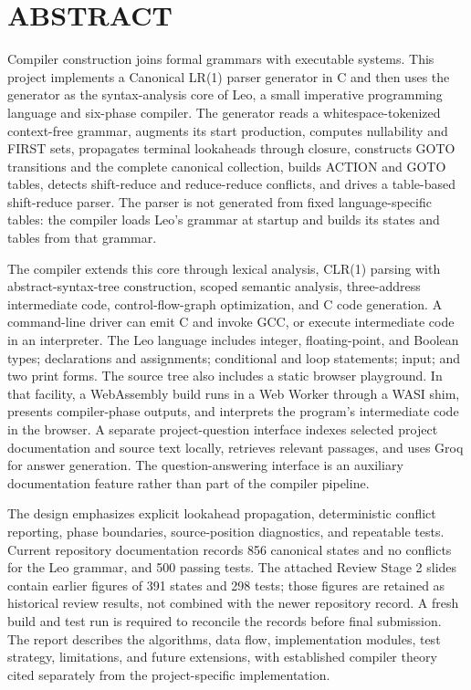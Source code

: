 \documentclass[12pt,a4paper,oneside]{report}
\begin{document}
\chapter*{ABSTRACT}
Compiler construction joins formal grammars with executable systems. This project implements a Canonical LR(1) parser generator in C and then uses the generator as the syntax-analysis core of Leo, a small imperative programming language and six-phase compiler. The generator reads a whitespace-tokenized context-free grammar, augments its start production, computes nullability and FIRST sets, propagates terminal lookaheads through closure, constructs GOTO transitions and the complete canonical collection, builds ACTION and GOTO tables, detects shift-reduce and reduce-reduce conflicts, and drives a table-based shift-reduce parser. The parser is not generated from fixed language-specific tables: the compiler loads Leo's grammar at startup and builds its states and tables from that grammar.\par
\vspace{0.3cm}
The compiler extends this core through lexical analysis, CLR(1) parsing with abstract-syntax-tree construction, scoped semantic analysis, three-address intermediate code, control-flow-graph optimization, and C code generation. A command-line driver can emit C and invoke GCC, or execute intermediate code in an interpreter. The Leo language includes integer, floating-point, and Boolean types; declarations and assignments; conditional and loop statements; input; and two print forms. The source tree also includes a static browser playground. In that facility, a WebAssembly build runs in a Web Worker through a WASI shim, presents compiler-phase outputs, and interprets the program's intermediate code in the browser. A separate project-question interface indexes selected project documentation and source text locally, retrieves relevant passages, and uses Groq for answer generation. The question-answering interface is an auxiliary documentation feature rather than part of the compiler pipeline.\par
\vspace{0.3cm}
The design emphasizes explicit lookahead propagation, deterministic conflict reporting, phase boundaries, source-position diagnostics, and repeatable tests. Current repository documentation records 856 canonical states and no conflicts for the Leo grammar, and 500 passing tests. The attached Review Stage 2 slides contain earlier figures of 391 states and 298 tests; those figures are retained as historical review results, not combined with the newer repository record. A fresh build and test run is required to reconcile the records before final submission. The report describes the algorithms, data flow, implementation modules, test strategy, limitations, and future extensions, with established compiler theory cited separately from the project-specific implementation.
\end{document}
